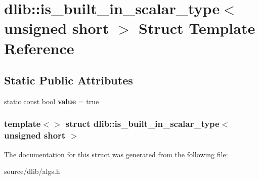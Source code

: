 \hypertarget{structdlib_1_1is__built__in__scalar__type_3_01unsigned_01short_01_4}{
\section{dlib::is\_\-built\_\-in\_\-scalar\_\-type$<$ unsigned short $>$ Struct Template Reference}
\label{structdlib_1_1is__built__in__scalar__type_3_01unsigned_01short_01_4}
}
\subsection*{Static Public Attributes}
\begin{DoxyCompactItemize}
\item 
\hypertarget{structdlib_1_1is__built__in__scalar__type_3_01unsigned_01short_01_4_a3444459f0318333fb407e3acadcee5ae}{
static const bool {\bfseries value} = true}
\label{structdlib_1_1is__built__in__scalar__type_3_01unsigned_01short_01_4_a3444459f0318333fb407e3acadcee5ae}

\end{DoxyCompactItemize}
\subsubsection*{template$<$$>$ struct dlib::is\_\-built\_\-in\_\-scalar\_\-type$<$ unsigned short $>$}



The documentation for this struct was generated from the following file:\begin{DoxyCompactItemize}
\item 
source/dlib/algs.h\end{DoxyCompactItemize}
